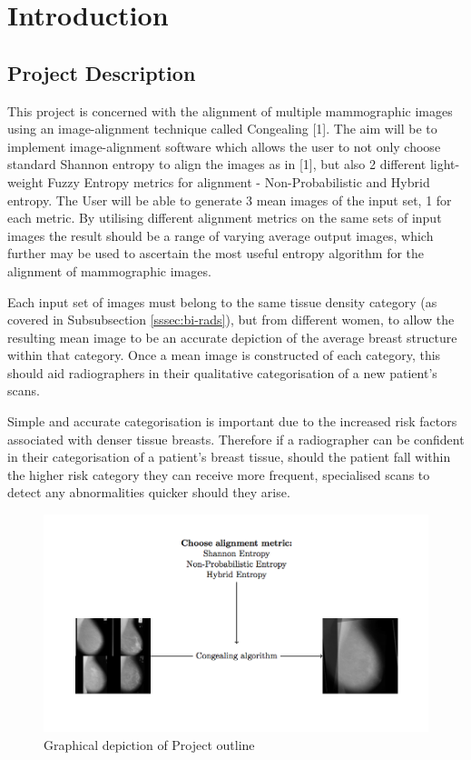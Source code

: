 \chapter{Introduction}

\section{Project Description}
This project is concerned with the alignment of multiple mammographic images using an image-alignment technique called \Gls{Congealing} [1]. The aim will be to implement image-alignment software which allows the user to not only choose standard Shannon entropy to align the images as in [1], but also 2 different light-weight Fuzzy Entropy metrics for alignment - Non-Probabilistic and Hybrid entropy. The User will be able to generate 3 mean images of the input set, 1 for each metric. By utilising different alignment metrics on the same sets of input images the result should be a range of varying average output images, which further may be used to ascertain the most useful entropy algorithm for the alignment of mammographic images.

Each input set of images must belong to the same tissue density category (as covered in Subsubsection \ref{sssec:bi-rads}), but from different women, to allow the resulting mean image to be an accurate depiction of the average breast structure within that category. Once a mean image is constructed of each category, this should aid radiographers in their qualitative categorisation of a new patient's scans.

Simple and accurate categorisation is important due to the increased risk factors associated with denser tissue breasts. Therefore if a radiographer can be confident in their categorisation of a patient's breast tissue, should the patient fall within the higher risk category they can receive more frequent, specialised scans to detect any abnormalities quicker should they arise.

\begin{figure}[H]
  \center
    \includegraphics{Introduction/diagram/diagram.png}
    \caption{Graphical depiction of Project outline}
    \label{fig:project-desc-img}
\end{figure}



